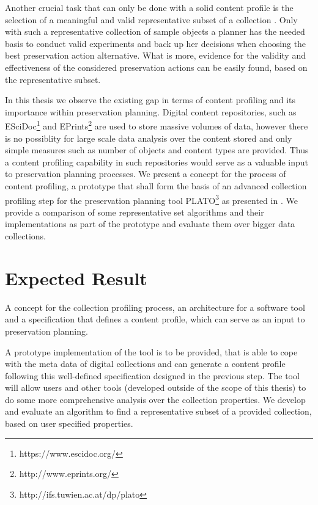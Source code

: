 \documentclass[a4paper,12pt]{scrartcl} %
\begin{document}
Another crucial task that can only be done with a solid content profile is the selection of a meaningful and valid representative subset of a collection \cite{Becker:2011:PDT:1998076.1998089, Pan05findingrepresentative}. Only with such a representative collection of sample objects a planner 
has the needed basis to conduct valid experiments and back up her decisions when choosing the best
preservation action alternative. What is more, evidence for the validity and effectiveness of the considered preservation actions can be easily found, based on the representative subset.

In this thesis we observe the existing gap in terms of content profiling and its importance within preservation
planning. Digital content repositories, such as ESciDoc\footnote{https://www.escidoc.org/} and EPrints\footnote{http://www.eprints.org/} are used to store massive volumes of data, however there is no possiblity for large scale data analysis over the content stored and only simple measures such as number of objects and content types are provided. Thus a content profiling capability in such repositories would serve as a valuable input to preservation planning processes. We present a concept for the process of content profiling, a prototype that shall form the basis of an advanced collection profiling step for the preservation planning tool PLATO\footnote{http://ifs.tuwien.ac.at/dp/plato} as presented in \cite{Rauber:2009:dpchallenges}. We provide a comparison of some representative
set algorithms and their implementations as part of the prototype and evaluate them over bigger data collections.

\section*{Expected Result}
A concept for the collection profiling process, an architecture for a software tool and a specification that defines a content profile, which can serve as an input to preservation planning.

A prototype implementation of the tool is to be provided, that is able to cope with the meta data of digital collections and can generate a content profile following this well-defined specification designed in the previous step. The tool will allow users and other tools (developed outside of the scope of this thesis) to do some more comprehensive analysis over the collection properties. We develop and evaluate an algorithm to find a representative subset of a provided collection, based on user specified properties.
\end{document}
